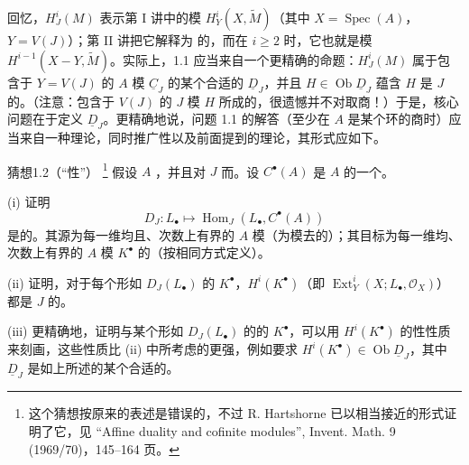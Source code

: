 回忆，$H^i_J(M)$ 表示第 I 讲中的模 $H^i_Y(X,\widetilde M)$（其中 $X=\operatorname{Spec}(A)$，$Y=V(J)$）；第 II 讲把它解释为 的，而在 $i\geq2$ 时，它也就是模 $H^{i-1}(X-Y,\widetilde M)$。实际上，1.1 应当来自一个更精确的命题：$H^i_J(M)$ 属于包含于 $Y=V(J)$ 的 $A$ 模 $\underline C_J$ 的某个合适的 $\underline D_J$，并且 $H\in\operatorname{Ob}\underline D_J$ 蕴含 $H$ 是 $J$ 的。（注意：包含于 $V(J)$ 的 $J$ 模 $H$ 所成的，很遗憾并不对取商！）于是，核心问题在于定义 $\underline D_J$。更精确地说，问题 1.1 的解答（至少在 $A$ 是某个环的商时）应当来自一种理论，同时推广性以及前面提到的理论，其形式应如下。

\begin{SGAresult}{猜想}{1.2（“性”）}
\footnote{这个猜想按原来的表述是错误的，不过 R. Hartshorne 已以相当接近的形式证明了它，见 “Affine duality and cofinite modules”, Invent. Math. 9 (1969/70)，145--164 页。}
假设 $A$ ，并且对 $J$ 而。设 $C^\bullet(A)$ 是 $A$ 的一个。

(i) 证明
\[
D_J:L_\bullet\longmapsto\operatorname{Hom}_J(L_\bullet,C^\bullet(A))
\]
是的。其源为每一维均且、次数上有界的 $A$ 模（为模去的）；其目标为每一维均、次数上有界的 $A$ 模 $K^\bullet$ 的（按相同方式定义）。

(ii) 证明，对于每个形如 $D_J(L_\bullet)$ 的 $K^\bullet$，$H^i(K^\bullet)$（即 $\operatorname{Ext}^i_Y(X;L_\bullet,\mathcal O_X)$）都是 $J$ 的。

(iii) 更精确地，证明与某个形如 $D_J(L_\bullet)$ 的的 $K^\bullet$，可以用 $H^i(K^\bullet)$ 的性性质来刻画，这些性质比 (ii) 中所考虑的更强，例如要求 $H^i(K^\bullet)\in\operatorname{Ob}\underline D_J$，其中 $\underline D_J$ 是如上所述的某个合适的。
\end{SGAresult}

